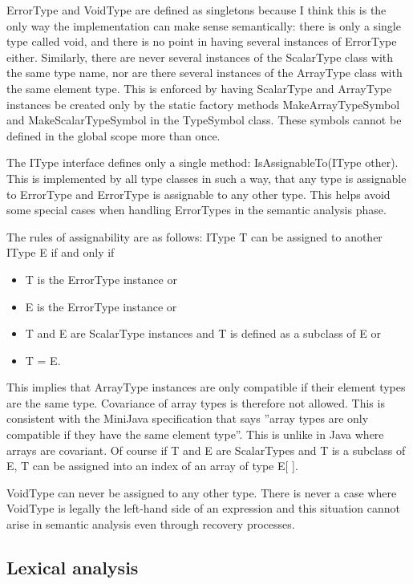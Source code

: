 \documentclass[a4paper,11pt]{article}
\begin{document}
ErrorType and VoidType are defined as singletons because I think this is the only way the implementation can make sense semantically: there is only a single type called void, and there is no point in having several instances of ErrorType either. Similarly, there are never several instances of the ScalarType class with the same type name, nor are there several instances of the ArrayType class with the same element type. This is enforced by having ScalarType and ArrayType instances be created only by the static factory methods MakeArrayTypeSymbol and MakeScalarTypeSymbol in the TypeSymbol class. These symbols cannot be defined in the global scope more than once.

The IType interface defines only a single method: IsAssignableTo(IType other). This is implemented by all type classes in such a way, that any type is assignable to ErrorType and ErrorType is assignable to any other type. This helps avoid some special cases when handling ErrorTypes in the semantic analysis phase.

The rules of assignability are as follows: IType T can be assigned to another IType E if and only if
\begin{itemize}
    \item T is the ErrorType instance or
    \item E is the ErrorType instance or
    \item T and E are ScalarType instances and T is defined as a subclass of E or
    \item T = E.
\end{itemize}

This implies that ArrayType instances are only compatible if their element types are the same type. Covariance of array types is therefore not allowed. This is consistent with the MiniJava specification that says ''array types are only compatible if they have the same element type''. This is unlike in Java where arrays are covariant. Of course if T and E are ScalarTypes and T is a subclass of E, T can be assigned into an index of an array of type E[ ].

VoidType can never be assigned to any other type. There is never a case where VoidType is legally the left-hand side of an expression and this situation cannot arise in semantic analysis even through recovery processes.

\subsection{Lexical analysis}
\end{document}
